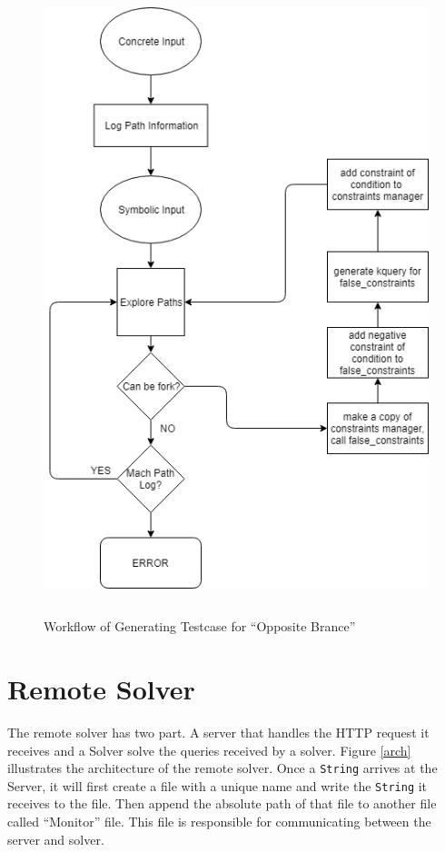 \begin{figure}%
\begin{center}
{\mbox{\includegraphics[height=500pt]{figures/testcase_generation.png}}}
\end{center}
\caption{\label{testcase_generation}Workflow of Generating Testcase for ``Opposite Brance''}
\end{figure}

\section{Remote Solver}

The remote solver has two part. A server that handles the HTTP request it receives and a Solver solve the queries received by a solver. Figure \ref{arch} illustrates the architecture of the remote solver. Once a \texttt{String} arrives at the Server, it will first create a file with a unique name and write the \texttt{String} it receives to the file. Then append the absolute path of that file to another file called ``Monitor'' file. This file is responsible for communicating between the server and solver. 

